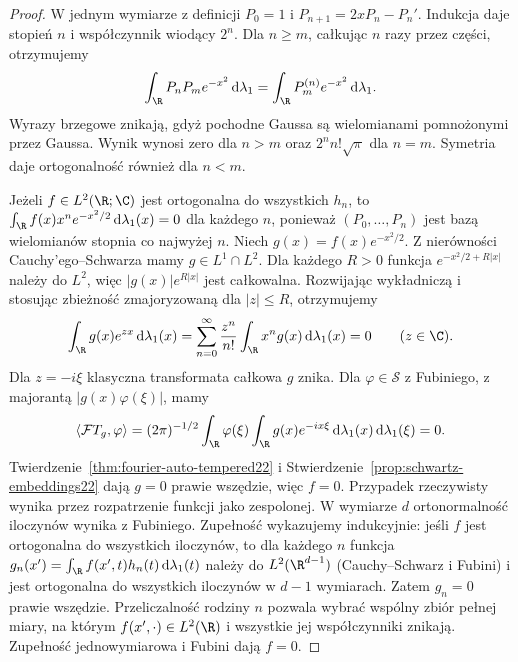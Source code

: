\begin{proof}
W jednym wymiarze z definicji $P_0=1$ i $P_{n+1}=2xP_n-P_n'$.
Indukcja daje stopień $n$ i współczynnik wiodący $2^n$.
Dla $n\ge m$, całkując $n$ razy przez części, otrzymujemy
\[
 \int_\R P_nP_m e^{-x^2}\,\mathrm d\lambda_1
 =\int_\R P_m^{(n)}e^{-x^2}\,\mathrm d\lambda_1.
\]
Wyrazy brzegowe znikają, gdyż pochodne Gaussa są
wielomianami pomnożonymi przez Gaussa. Wynik wynosi zero
dla $n>m$ oraz $2^n n!\sqrt\pi$ dla $n=m$.
Symetria daje ortogonalność również dla $n<m$.

Jeżeli $f\in L^2(\R;\C)$ jest ortogonalna do wszystkich
$h_n$, to $\int_\R f(x)x^n e^{-x^2/2}\,\mathrm d\lambda_1(x)=0$
dla każdego $n$, ponieważ $(P_0,\ldots,P_n)$ jest bazą
wielomianów stopnia co najwyżej $n$. Niech $g(x)=f(x)e^{-x^2/2}$.
Z nierówności Cauchy'ego--Schwarza mamy $g\in L^1\cap L^2$.
Dla każdego $R>0$ funkcja $e^{-x^2/2+R|x|}$ należy do $L^2$,
więc $|g(x)|e^{R|x|}$ jest całkowalna.
Rozwijając wykładniczą i stosując zbieżność zmajoryzowaną
dla $|z|\le R$, otrzymujemy
\[
 \int_\R g(x)e^{zx}\,\mathrm d\lambda_1(x)
 =\sum_{n=0}^\infty\frac{z^n}{n!}
 \int_\R x^ng(x)\,\mathrm d\lambda_1(x)=0
 \qquad(z\in\C).
\]
Dla $z=-i\xi$ klasyczna transformata całkowa $g$ znika.
Dla $\varphi\in\mathcal S$ z Fubiniego, z majorantą
$|g(x)\varphi(\xi)|$, mamy
\[
 \langle\mathcal F T_g,\varphi\rangle
 =(2\pi)^{-1/2}\int_\R\varphi(\xi)
 \int_\R g(x)e^{-ix\xi}\,\mathrm d\lambda_1(x)
 \,\mathrm d\lambda_1(\xi)=0.
\]
Twierdzenie~\ref{thm:fourier-auto-tempered22} i
Stwierdzenie~\ref{prop:schwartz-embeddings22} dają
$g=0$ prawie wszędzie, więc $f=0$. Przypadek rzeczywisty
wynika przez rozpatrzenie funkcji jako zespolonej.
W wymiarze $d$ ortonormalność iloczynów wynika z Fubiniego.
Zupełność wykazujemy indukcyjnie: jeśli $f$ jest
ortogonalna do wszystkich iloczynów, to dla każdego $n$
funkcja $g_n(x')=\int_\R f(x',t)h_n(t)\,\mathrm d\lambda_1(t)$
należy do $L^2(\R^{d-1})$ (Cauchy--Schwarz i Fubini)
i jest ortogonalna do wszystkich iloczynów w $d-1$
wymiarach. Zatem $g_n=0$ prawie wszędzie.
Przeliczalność rodziny $n$ pozwala wybrać wspólny zbiór
pełnej miary, na którym $f(x',\cdot)\in L^2(\R)$ i
wszystkie jej współczynniki znikają. Zupełność
jednowymiarowa i Fubini dają $f=0$.


\end{proof}
